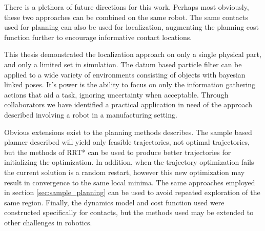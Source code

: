 \documentclass[../thesis.tex]{subfiles}
\begin{document}
There is a plethora of future directions for this work.
Perhaps most obviously, these two approaches can be combined on the same robot.
The same contacts used for planning can also be used for localization, augmenting the planning cost function further to encourage informative contact locations.

This thesis demonstrated the localization approach on only a single physical part, and only a limited set in simulation.
The datum based particle filter can be applied to a wide variety of environments consisting of objects with bayesian linked poses.
It's power is the ability to focus on only the information gathering actions that aid a task, ignoring uncertainty when acceptable.
Through collaborators we have identified a practical application in need of the approach described involving a robot in a manufacturing setting.

Obvious extensions exist to the planning methods describes. The sample based planner described will yield only feasible trajectories, not optimal trajectories, but the methods of RRT* can be used to produce better trajectories for initializing the optimization.
In addition, when the trajectory optimization fails the current solution is a random restart, however this new optimization may result in convergence to the same local minima.
The same approaches employed in section \ref{sec:sample_planning} can be used to avoid repeated exploration of the same region.
Finally, the dynamics model and cost function used were constructed specifically for contacts, but the methods used may be extended to other challenges in robotics.
\end{document}
